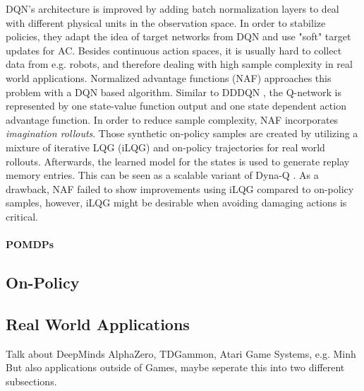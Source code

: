 		DQN's \cite{Mnih2015} architecture is improved by adding batch normalization layers \cite{Ioffe2015} to deal with different physical units in the observation space. 
		In order to stabilize policies, they adapt the idea of target networks from DQN \cite{Mnih2015} and use "soft" target updates for AC. 
		Besides continuous action spaces, it is usually hard to collect data from e.g. robots, and therefore dealing with high sample complexity in real world applications.
		Normalized advantage functions (NAF) \cite{Gu2016} approaches this problem with a DQN based algorithm.
		Similar to DDDQN \cite{Wang2016}, the Q-network is represented by one state-value function output and one state dependent action advantage function.
		In order to reduce sample complexity, NAF incorporates \textit{imagination rollouts}. 
		Those synthetic on-policy samples are created by utilizing a mixture of iterative LQG (iLQG) \cite{Todorov2005} and on-policy trajectories for real world rollouts.
		Afterwards, the learned model for the states is used to generate replay memory entries. 
		This can be seen as a scalable variant of Dyna-Q \cite{Sutton1990}. 
		As a drawback, NAF failed to show improvements using iLQG compared to on-policy samples, however, iLQG might be desirable when avoiding damaging actions is critical. 
		
		
		
		
 	\paragraph{POMDPs}
    \subsection{On-Policy}
    \label{sec:on-policy}
	
    \subsection{Real World Applications}
    \label{sec:games}
    Talk about DeepMinds AlphaZero, TDGammon, Atari Game Systems, e.g. Minh
    But also applications outside of Games, maybe seperate this into two different subsections.
